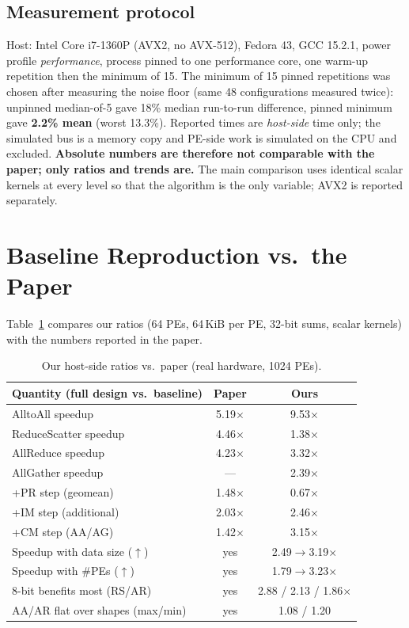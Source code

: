 \documentclass[conference]{IEEEtran}
\begin{document}
\subsection{Measurement protocol}
Host: Intel Core i7-1360P (AVX2, no AVX-512), Fedora 43, GCC 15.2.1, power profile \emph{performance}, process pinned to one performance core, one warm-up repetition then the minimum of 15. The minimum of 15 pinned repetitions was chosen after measuring the noise floor (same 48 configurations measured twice): unpinned median-of-5 gave 18\% median run-to-run difference, pinned minimum gave \textbf{2.2\% mean} (worst 13.3\%). Reported times are \emph{host-side} time only; the simulated bus is a memory copy and PE-side work is simulated on the CPU and excluded. \textbf{Absolute numbers are therefore not comparable with the paper; only ratios and trends are.} The main comparison uses identical scalar kernels at every level so that the algorithm is the only variable; AVX2 is reported separately.

\section{Baseline Reproduction vs.\ the Paper}
Table~\ref{tab:paper} compares our ratios (64 PEs, 64\,KiB per PE, 32-bit sums, scalar kernels) with the numbers reported in the paper.
\begin{table}[t]\centering\caption{Our host-side ratios vs.\ paper (real hardware, 1024 PEs).}\label{tab:paper}\small
\begin{tabular}{@{}lcc@{}}\toprule Quantity (full design vs.\ baseline) & Paper & Ours\\\midrule
AlltoAll speedup & 5.19$\times$ & 9.53$\times$\\ ReduceScatter speedup & 4.46$\times$ & 1.38$\times$\\ AllReduce speedup & 4.23$\times$ & 3.32$\times$\\ AllGather speedup & --- & 2.39$\times$\\
+PR step (geomean) & 1.48$\times$ & 0.67$\times$\\ +IM step (additional) & 2.03$\times$ & 2.46$\times$\\ +CM step (AA/AG) & 1.42$\times$ & 3.15$\times$\\
Speedup with data size ($\uparrow$) & yes & 2.49$\to$3.19$\times$\\ Speedup with \#PEs ($\uparrow$) & yes & 1.79$\to$3.23$\times$\\
8-bit benefits most (RS/AR) & yes & 2.88 / 2.13 / 1.86$\times$\\ AA/AR flat over shapes (max/min) & yes & 1.08 / 1.20\\
\bottomrule\end{tabular}\end{table}
\end{document}
